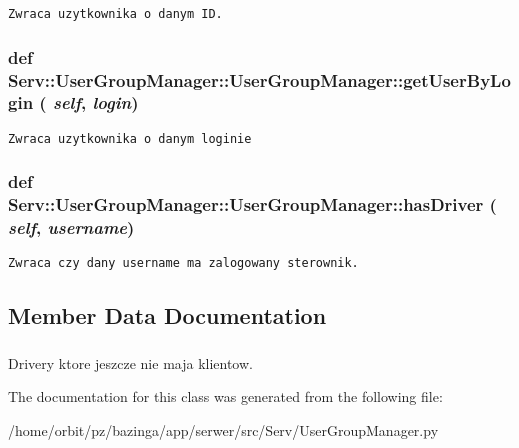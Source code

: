 \footnotesize\begin{verbatim}Zwraca uzytkownika o danym ID.\end{verbatim}
\normalsize
 \hypertarget{class_serv_1_1_user_group_manager_1_1_user_group_manager_ed20d08470748f78a641e6cc5700b505}{
\subsubsection[{getUserByLogin}]{\setlength{\rightskip}{0pt plus 5cm}def Serv::UserGroupManager::UserGroupManager::getUserByLogin ( {\em self}, \/   {\em login})}}
\label{class_serv_1_1_user_group_manager_1_1_user_group_manager_ed20d08470748f78a641e6cc5700b505}




\footnotesize\begin{verbatim}Zwraca uzytkownika o danym loginie\end{verbatim}
\normalsize
 \hypertarget{class_serv_1_1_user_group_manager_1_1_user_group_manager_39ae7245da0bcda25ce712d1b55f2f29}{
\subsubsection[{hasDriver}]{\setlength{\rightskip}{0pt plus 5cm}def Serv::UserGroupManager::UserGroupManager::hasDriver ( {\em self}, \/   {\em username})}}
\label{class_serv_1_1_user_group_manager_1_1_user_group_manager_39ae7245da0bcda25ce712d1b55f2f29}




\footnotesize\begin{verbatim}Zwraca czy dany username ma zalogowany sterownik.\end{verbatim}
\normalsize
 

\subsection{Member Data Documentation}
\hypertarget{class_serv_1_1_user_group_manager_1_1_user_group_manager_00aa453d586337ce2692166c666a1817}{
\subsubsection[{drivers}]{}}
\label{class_serv_1_1_user_group_manager_1_1_user_group_manager_00aa453d586337ce2692166c666a1817}


Drivery ktore jeszcze nie maja klientow. 



The documentation for this class was generated from the following file:\begin{CompactItemize}
\item 
/home/orbit/pz/bazinga/app/serwer/src/Serv/UserGroupManager.py\end{CompactItemize}

